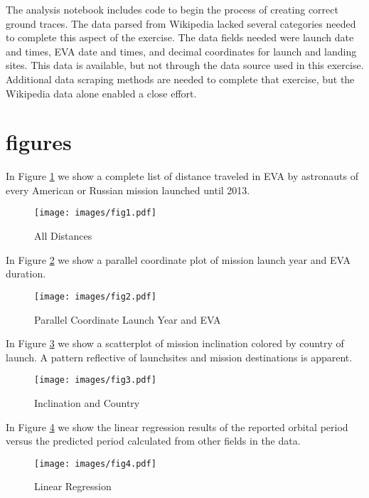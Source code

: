 \documentclass[sigconf]{acmart}
\begin{document}
The analysis notebook includes code to begin the process of creating correct ground traces. The data parsed from Wikipedia lacked several categories needed to complete this aspect of the exercise. The data fields needed were launch date and times, EVA date and times, and decimal coordinates for launch and landing sites. This data is available, but not through the data source used in this exercise. Additional data scraping methods are needed to complete that exercise, but the Wikipedia data alone enabled a close effort.




\section{figures}

In Figure \ref{f:fig1} we show a complete list of distance traveled in EVA by astronauts of every American or Russian mission launched until 2013. 

\begin{figure}[!ht]
  \centering\texttt{[image: images/fig1.pdf]}
  \caption{All Distances}\label{f:fig1}
\end{figure}


In Figure \ref{f:fig2} we show a parallel coordinate plot of mission launch year and EVA duration. 

\begin{figure}[!ht]
	\centering\texttt{[image: images/fig2.pdf]}
	\caption{Parallel Coordinate Launch Year and EVA}\label{f:fig2}
\end{figure}


In Figure \ref{f:fig3} we show a scatterplot of mission inclination colored by country of launch. A pattern reflective of launchsites and mission destinations is apparent.

\begin{figure}[!ht]
	\centering\texttt{[image: images/fig3.pdf]}
	\caption{Inclination and Country}\label{f:fig3}
\end{figure}


In Figure \ref{f:fig4} we show the linear regression results of the reported orbital period versus the predicted period calculated from other fields in the data. 

\begin{figure}[!ht]
	\centering\texttt{[image: images/fig4.pdf]}
	\caption{Linear Regression}\label{f:fig4}
\end{figure}
\end{document}
